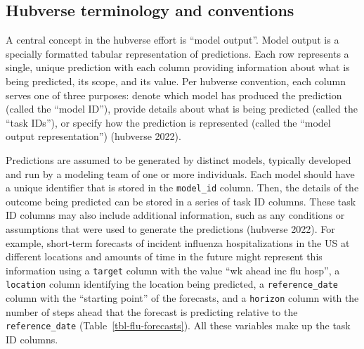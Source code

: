 \documentclass[
]{article}
\begin{document}
\subsection{Hubverse terminology and
conventions}\label{hubverse-terminology-and-conventions}

A central concept in the hubverse effort is ``model output''. Model
output is a specially formatted tabular representation of predictions.
Each row represents a single, unique prediction with each column
providing information about what is being predicted, its scope, and its
value. Per hubverse convention, each column serves one of three
purposes: denote which model has produced the prediction (called the
``model ID''), provide details about what is being predicted (called the
``task IDs''), or specify how the prediction is represented (called the
``model output representation'') (hubverse 2022).

Predictions are assumed to be generated by distinct models, typically
developed and run by a modeling team of one or more individuals. Each
model should have a unique identifier that is stored in the
\texttt{model\_id} column. Then, the details of the outcome being
predicted can be stored in a series of task ID columns. These task ID
columns may also include additional information, such as any conditions
or assumptions that were used to generate the predictions (hubverse
2022). For example, short-term forecasts of incident influenza
hospitalizations in the US at different locations and amounts of time in
the future might represent this information using a \texttt{target}
column with the value ``wk ahead inc flu hosp'', a \texttt{location}
column identifying the location being predicted, a
\texttt{reference\_date} column with the ``starting point'' of the
forecasts, and a \texttt{horizon} column with the number of steps ahead
that the forecast is predicting relative to the \texttt{reference\_date}
(Table~\ref{tbl-flu-forecasts}). All these variables make up the task ID
columns.
\end{document}

